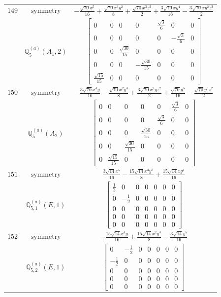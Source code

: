 \documentclass[fleqn,8pt,landscape]{jsarticle}
\begin{document}
\begin{longtable}{ccc}
$ 149 $ & $ \text{symmetry} $ & $ - \frac{\sqrt{70} x^{5}}{16} + \frac{\sqrt{70} x^{3} y^{2}}{8} + \frac{\sqrt{70} x^{3} z^{2}}{2} + \frac{3 \sqrt{70} x y^{4}}{16} - \frac{3 \sqrt{70} x y^{2} z^{2}}{2} $ \\
$  $ & $ \mathbb{Q}_{5}^{(a)}(A_{1},2) $ & $ \begin{bmatrix} 0 & 0 & 0 & 0 & \frac{\sqrt{3}}{6} & 0 & 0 \\ 0 & 0 & 0 & 0 & 0 & - \frac{\sqrt{3}}{6} & 0 \\ 0 & 0 & \frac{\sqrt{30}}{15} & 0 & 0 & 0 & 0 \\ 0 & 0 & 0 & - \frac{\sqrt{30}}{15} & 0 & 0 & 0 \\ \frac{\sqrt{15}}{15} & 0 & 0 & 0 & 0 & 0 & 0 \end{bmatrix} $ \\ \hline
$ 150 $ & $ \text{symmetry} $ & $ - \frac{3 \sqrt{70} x^{4} y}{16} - \frac{\sqrt{70} x^{2} y^{3}}{8} + \frac{3 \sqrt{70} x^{2} y z^{2}}{2} + \frac{\sqrt{70} y^{5}}{16} - \frac{\sqrt{70} y^{3} z^{2}}{2} $ \\
$  $ & $ \mathbb{Q}_{5}^{(a)}(A_{2}) $ & $ \begin{bmatrix} 0 & 0 & 0 & 0 & 0 & \frac{\sqrt{3}}{6} & 0 \\ 0 & 0 & 0 & 0 & \frac{\sqrt{3}}{6} & 0 & 0 \\ 0 & 0 & 0 & \frac{\sqrt{30}}{15} & 0 & 0 & 0 \\ 0 & 0 & \frac{\sqrt{30}}{15} & 0 & 0 & 0 & 0 \\ 0 & \frac{\sqrt{15}}{15} & 0 & 0 & 0 & 0 & 0 \end{bmatrix} $ \\ \hline
$ 151 $ & $ \text{symmetry} $ & $ \frac{3 \sqrt{14} x^{5}}{16} - \frac{15 \sqrt{14} x^{3} y^{2}}{8} + \frac{15 \sqrt{14} x y^{4}}{16} $ \\
$  $ & $ \mathbb{Q}_{5,1}^{(a)}(E,1) $ & $ \begin{bmatrix} \frac{1}{2} & 0 & 0 & 0 & 0 & 0 & 0 \\ 0 & - \frac{1}{2} & 0 & 0 & 0 & 0 & 0 \\ 0 & 0 & 0 & 0 & 0 & 0 & 0 \\ 0 & 0 & 0 & 0 & 0 & 0 & 0 \\ 0 & 0 & 0 & 0 & 0 & 0 & 0 \end{bmatrix} $ \\ \hline
$ 152 $ & $ \text{symmetry} $ & $ - \frac{15 \sqrt{14} x^{4} y}{16} + \frac{15 \sqrt{14} x^{2} y^{3}}{8} - \frac{3 \sqrt{14} y^{5}}{16} $ \\
$  $ & $ \mathbb{Q}_{5,2}^{(a)}(E,1) $ & $ \begin{bmatrix} 0 & - \frac{1}{2} & 0 & 0 & 0 & 0 & 0 \\ - \frac{1}{2} & 0 & 0 & 0 & 0 & 0 & 0 \\ 0 & 0 & 0 & 0 & 0 & 0 & 0 \\ 0 & 0 & 0 & 0 & 0 & 0 & 0 \\ 0 & 0 & 0 & 0 & 0 & 0 & 0 \end{bmatrix} $ \\ \hline

\end{longtable}
\end{document}
